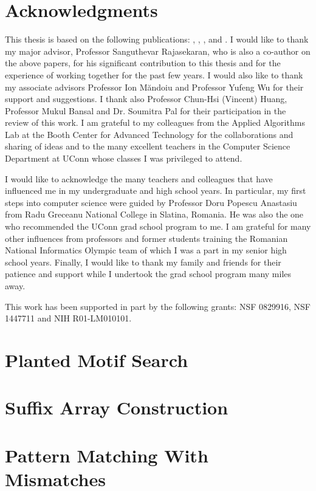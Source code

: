 \documentclass{report}
\begin{document}
\chapter*{Acknowledgments}
This thesis is based on the following publications: \cite{NRPMS14},
\cite{NRPMS15}, \cite{RNSA14}, \cite{NRKM15} and \cite{NRKM16}. I would like to
thank my major advisor, Professor Sanguthevar Rajasekaran, who is also a
co-author on the above papers, for his significant contribution to this thesis
and for the experience of working together for the past few
years.
I would also like to thank my associate advisors Professor Ion M\u{a}ndoiu and
Professor Yufeng Wu for their support and suggestions. I thank also 
Professor Chun-Hsi (Vincent) Huang, Professor Mukul Bansal and Dr. Soumitra
Pal for their participation in the review of this work. I am grateful to
my colleagues from the Applied Algorithms Lab at the Booth Center for Advanced
Technology for the collaborations and sharing of ideas and to
the many excellent teachers in the Computer Science Department at UConn
whose classes I was privileged to attend. 

I would like to acknowledge the
many teachers and colleagues that have influenced me in my undergraduate and
high school years.
In particular, my first steps into computer science were guided by Professor
Doru Popescu Anastasiu from Radu Greceanu National College in Slatina, Romania.
He was also the one who recommended the UConn grad school program to me.
I am grateful for many other influences from professors and former
students training the Romanian National Informatics Olympic team of which I was
a part in my senior high school years. Finally, I would like to thank my family
and friends for their patience and support while I undertook the grad school
program many miles away.

 This work has been supported in part by the following grants:
NSF 0829916, NSF 1447711 and NIH R01-LM010101.

\tableofcontents

\listoffigures
\listoftables
\listofalgorithms

\cleardoublepage{}

\chapter{Planted Motif Search}


\chapter{Suffix Array Construction}


\chapter{Pattern Matching With Mismatches}



\cleardoublepage
{}
{}

 
\end{document}
